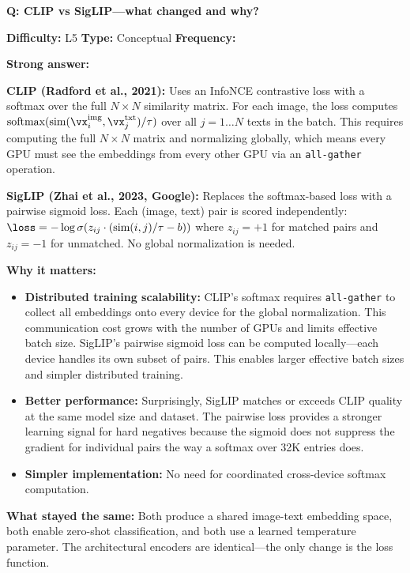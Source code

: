 \begin{interviewq}
\textbf{Q: CLIP vs SigLIP---what changed and why?}

\textbf{Difficulty:} L5 \quad \textbf{Type:} Conceptual \quad \textbf{Frequency:} \freqmed{}

\textbf{Strong answer:}

\textbf{CLIP (Radford et al., 2021):} Uses an InfoNCE contrastive loss with a softmax over the full $N \times N$ similarity matrix. For each image, the loss computes $\text{softmax}(\text{sim}(\vx_i^{\text{img}}, \vx_j^{\text{txt}}) / \tau)$ over all $j = 1 \ldots N$ texts in the batch. This requires computing the full $N \times N$ matrix and normalizing globally, which means every GPU must see the embeddings from every other GPU via an \texttt{all-gather} operation.

\textbf{SigLIP (Zhai et al., 2023, Google):} Replaces the softmax-based loss with a pairwise sigmoid loss. Each (image, text) pair is scored independently: $\loss = -\log\sigma(z_{ij} \cdot (\text{sim}(i,j)/\tau - b))$ where $z_{ij} = +1$ for matched pairs and $z_{ij} = -1$ for unmatched. No global normalization is needed.

\textbf{Why it matters:}
\begin{itemize}
    \item \textbf{Distributed training scalability:} CLIP's softmax requires \texttt{all-gather} to collect all embeddings onto every device for the global normalization. This communication cost grows with the number of GPUs and limits effective batch size. SigLIP's pairwise sigmoid loss can be computed locally---each device handles its own subset of pairs. This enables larger effective batch sizes and simpler distributed training.
    \item \textbf{Better performance:} Surprisingly, SigLIP matches or exceeds CLIP quality at the same model size and dataset. The pairwise loss provides a stronger learning signal for hard negatives because the sigmoid does not suppress the gradient for individual pairs the way a softmax over 32K entries does.
    \item \textbf{Simpler implementation:} No need for coordinated cross-device softmax computation.
\end{itemize}

\textbf{What stayed the same:} Both produce a shared image-text embedding space, both enable zero-shot classification, and both use a learned temperature parameter. The architectural encoders are identical---the only change is the loss function.


\end{interviewq}
